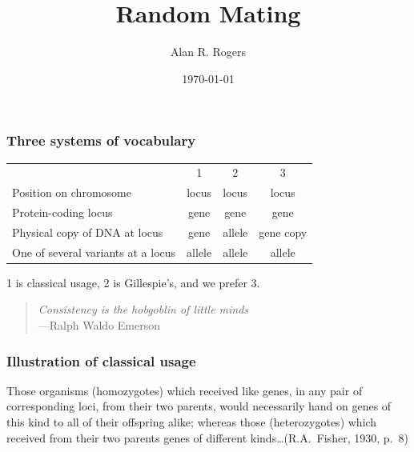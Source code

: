 \documentclass[12pt]{beamer}
\title{Random Mating}
\author{Alan R. Rogers}
\date{\today}
\begin{document}
\frame{\titlepage}

\begin{frame}
\frametitle{Three systems of vocabulary}
\begin{tabular}{p{2.2in}ccc}
                        &   1   & 2 & 3\\
Position on chromosome  & locus & locus & locus\\
Protein-coding locus    & gene  & gene & gene\\
Physical copy of DNA at locus  & gene  & allele &gene copy\\
One of several variants at a locus& allele & allele & allele\\
\end{tabular}

\bigskip

1 is classical usage, 2 is Gillespie's, and we prefer 3.

\bigskip

\pause
\begin{quote}
\emph{Consistency is the hobgoblin of little minds\\}
\mbox{}\hfill---Ralph Waldo Emerson
\end{quote}
\end{frame}

\begin{frame}
\frametitle{Illustration of classical usage}
Those organisms (homozygotes) which received like genes, in any pair
of corresponding loci, from their two parents, would necessarily hand
on genes of this kind to all of their offspring alike; whereas those
(heterozygotes) which received from their two parents genes of
different kinds\ldots (R.A.\ Fisher, 1930, p.~8)
\end{frame}
\end{document}
